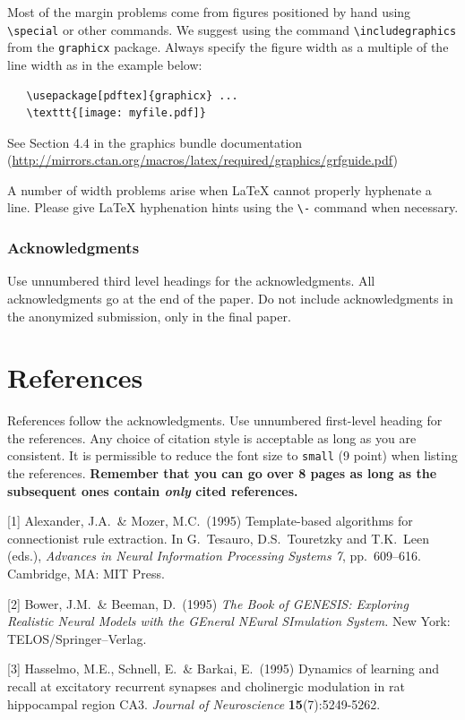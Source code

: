 \documentclass{article}
\begin{document}
Most of the margin problems come from figures positioned by hand using
\verb+\special+ or other commands. We suggest using the command
\verb+\includegraphics+ from the \verb+graphicx+ package. Always
specify the figure width as a multiple of the line width as in the
example below:
\begin{verbatim}
   \usepackage[pdftex]{graphicx} ...
   \texttt{[image: myfile.pdf]}
\end{verbatim}
See Section 4.4 in the graphics bundle documentation
(\url{http://mirrors.ctan.org/macros/latex/required/graphics/grfguide.pdf})

A number of width problems arise when \LaTeX{} cannot properly
hyphenate a line. Please give LaTeX hyphenation hints using the
\verb+\-+ command when necessary.

\subsubsection*{Acknowledgments}

Use unnumbered third level headings for the acknowledgments. All
acknowledgments go at the end of the paper. Do not include
acknowledgments in the anonymized submission, only in the final paper.

\section*{References}

References follow the acknowledgments. Use unnumbered first-level
heading for the references. Any choice of citation style is acceptable
as long as you are consistent. It is permissible to reduce the font
size to \verb+small+ (9 point) when listing the references. {\bf
  Remember that you can go over 8 pages as long as the subsequent ones contain
  \emph{only} cited references.}
\medskip

\small

[1] Alexander, J.A.\ \& Mozer, M.C.\ (1995) Template-based algorithms
for connectionist rule extraction. In G.\ Tesauro, D.S.\ Touretzky and
T.K.\ Leen (eds.), {\it Advances in Neural Information Processing
  Systems 7}, pp.\ 609--616. Cambridge, MA: MIT Press.

[2] Bower, J.M.\ \& Beeman, D.\ (1995) {\it The Book of GENESIS:
  Exploring Realistic Neural Models with the GEneral NEural SImulation
  System.}  New York: TELOS/Springer--Verlag.

[3] Hasselmo, M.E., Schnell, E.\ \& Barkai, E.\ (1995) Dynamics of
learning and recall at excitatory recurrent synapses and cholinergic
modulation in rat hippocampal region CA3. {\it Journal of
  Neuroscience} {\bf 15}(7):5249-5262.
\end{document}
